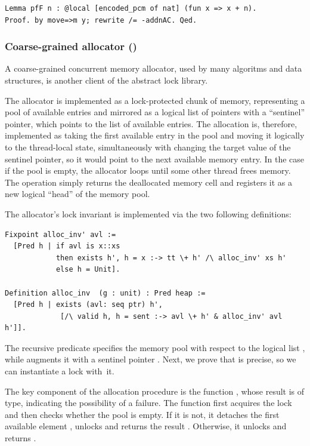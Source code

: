 \begin{lstlisting}
Lemma pfF n : @local [encoded_pcm of nat] (fun x => x + n). 
Proof. by move=>m y; rewrite /= -addnAC. Qed.
\end{lstlisting}

\subsubsection{Coarse-grained allocator ()}
\label{sec:allocator}

A coarse-grained concurrent memory allocator, used by many algoritms
and data structures, is another client of the abstract lock
library. 

The allocator is implemented as a lock-protected chunk of memory,
representing a pool of available entries and mirrored as a logical
list of pointers with a ``sentinel'' pointer, which points to the list
of available entries. The allocation is, therefore, implemented as
taking the first available entry in the pool and moving it logically to the
thread-local state, simultaneously with changing the target value of
the sentinel pointer, so it would point to the next available memory
entry. In the case if the pool is empty, the allocator loops until
some other thread frees memory. The  operation simply
returns the deallocated memory cell and registers it as a new logical
``head'' of the memory pool.

The allocator's lock invariant is implemented via the two following
definitions:

\begin{lstlisting}
Fixpoint alloc_inv' avl := 
  [Pred h | if avl is x::xs 
            then exists h', h = x :-> tt \+ h' /\ alloc_inv' xs h'
            else h = Unit].

Definition alloc_inv  (g : unit) : Pred heap := 
  [Pred h | exists (avl: seq ptr) h', 
             [/\ valid h, h = sent :-> avl \+ h' & alloc_inv' avl h']].
\end{lstlisting}

The recursive predicate  specifies the memory pool
with respect to the logical list , while 
augments it with a sentinel pointer . Next, we prove that
 is precise, so we can instantiate a lock
with~it.

The key component of the allocation procedure is the function
, whose result is of  type, indicating
the possibility of a failure. The function first acquires the lock and
then checks whether the pool is empty. If it is not, it detaches the
first available element , unlocks and returns the result
. Otherwise, it unlocks and returns .

